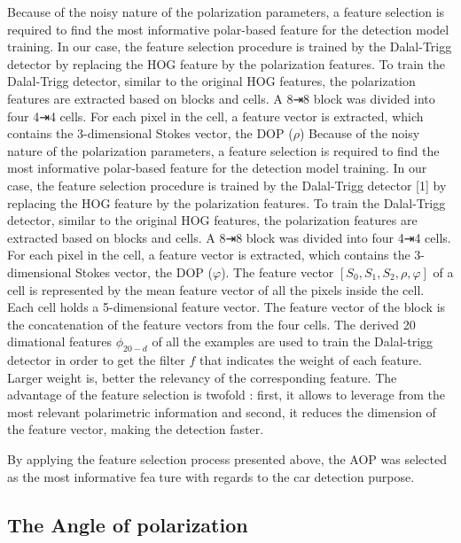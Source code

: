 \documentclass[10pt,twocolumn,letterpaper]{article}
\begin{document}
Because of the noisy nature of the polarization parameters,
a feature selection is required to find the most informative
polar-based feature for the detection model training. In our
case, the feature selection procedure is trained by the Dalal-Trigg detector \cite{_1_} by replacing the HOG feature by the polarization features.
To train the Dalal-Trigg detector, similar to the original
HOG features, the polarization features are extracted based
on blocks and cells. A 8⇥8 block was divided into four 4⇥4
cells. For each pixel in the cell, a feature vector is extracted,
which contains the 3-dimensional Stokes vector, the DOP ($\rho$) Because of the noisy nature of the polarization parameters,
a feature selection is required to find the most informative
polar-based feature for the detection model training. In our
case, the feature selection procedure is trained by the Dalal-Trigg detector [1] by replacing the HOG feature by the polarization features.
To train the Dalal-Trigg detector, similar to the original
HOG features, the polarization features are extracted based
on blocks and cells. A 8⇥8 block was divided into four 4⇥4
cells. For each pixel in the cell, a feature vector is extracted,
which contains the 3-dimensional Stokes vector, the DOP ($\varphi$). The feature vector $[S_{0},S_{1},S_{2},\rho,\varphi]$ of a cell is represented by the mean feature vector of all the pixels inside the cell. Each cell holds a 5-dimensional feature
vector. The feature vector of the block is the concatenation
of the feature vectors from the four cells. The derived 20 dimational features $\phi_{20-d}$ of all the examples are used to
train the Dalal-trigg detector in order to get the filter $f$ that
indicates the weight of each feature. Larger weight is, better
the relevancy of the corresponding feature. The advantage of
the feature selection is twofold : first, it allows to leverage
from the most relevant polarimetric information and second,
it reduces the dimension of the feature vector, making the detection faster.

By applying the feature selection process presented
above, the AOP was selected as the most informative feature with regards to the car detection purpose.

\subsection{The Angle of polarization}
\end{document}
